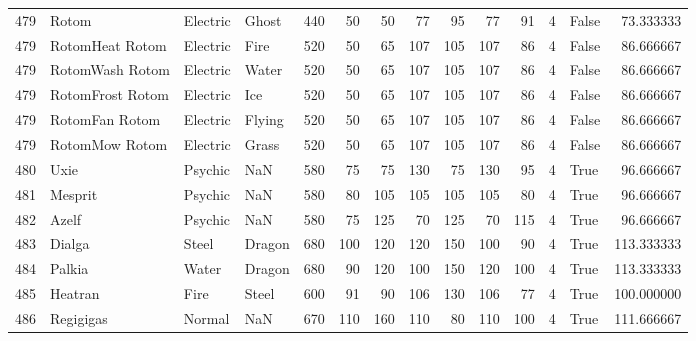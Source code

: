 \begin{tabular}{rlllrrrrrrrrlr}
 479 &                      Rotom &  Electric &     Ghost &    440 &   50 &      50 &       77 &       95 &       77 &     91 &           4 &      False &   73.333333 \\
 479 &            RotomHeat Rotom &  Electric &      Fire &    520 &   50 &      65 &      107 &      105 &      107 &     86 &           4 &      False &   86.666667 \\
 479 &            RotomWash Rotom &  Electric &     Water &    520 &   50 &      65 &      107 &      105 &      107 &     86 &           4 &      False &   86.666667 \\
 479 &           RotomFrost Rotom &  Electric &       Ice &    520 &   50 &      65 &      107 &      105 &      107 &     86 &           4 &      False &   86.666667 \\
 479 &             RotomFan Rotom &  Electric &    Flying &    520 &   50 &      65 &      107 &      105 &      107 &     86 &           4 &      False &   86.666667 \\
 479 &             RotomMow Rotom &  Electric &     Grass &    520 &   50 &      65 &      107 &      105 &      107 &     86 &           4 &      False &   86.666667 \\
 480 &                       Uxie &   Psychic &       NaN &    580 &   75 &      75 &      130 &       75 &      130 &     95 &           4 &       True &   96.666667 \\
 481 &                    Mesprit &   Psychic &       NaN &    580 &   80 &     105 &      105 &      105 &      105 &     80 &           4 &       True &   96.666667 \\
 482 &                      Azelf &   Psychic &       NaN &    580 &   75 &     125 &       70 &      125 &       70 &    115 &           4 &       True &   96.666667 \\
 483 &                     Dialga &     Steel &    Dragon &    680 &  100 &     120 &      120 &      150 &      100 &     90 &           4 &       True &  113.333333 \\
 484 &                     Palkia &     Water &    Dragon &    680 &   90 &     120 &      100 &      150 &      120 &    100 &           4 &       True &  113.333333 \\
 485 &                    Heatran &      Fire &     Steel &    600 &   91 &      90 &      106 &      130 &      106 &     77 &           4 &       True &  100.000000 \\
 486 &                  Regigigas &    Normal &       NaN &    670 &  110 &     160 &      110 &       80 &      110 &    100 &           4 &       True &  111.666667 \\

\end{tabular}
